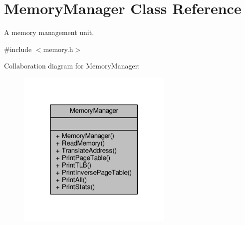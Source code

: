\hypertarget{classMemoryManager}{}\section{Memory\+Manager Class Reference}
\label{classMemoryManager}


A memory management unit.  




{\ttfamily \#include $<$memory.\+h$>$}



Collaboration diagram for Memory\+Manager\+:
\nopagebreak
\begin{figure}[H]
\begin{center}
\leavevmode
\includegraphics[width=211pt]{classMemoryManager__coll__graph}
\end{center}
\end{figure}
